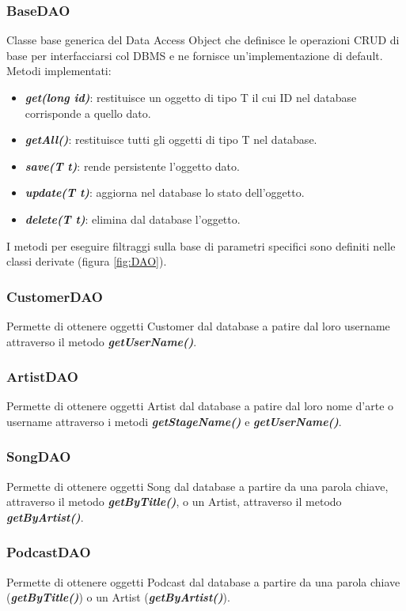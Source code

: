 \documentclass{article}
\begin{document}
  \subsubsection{BaseDAO}
  Classe base generica del Data Access Object che definisce le operazioni CRUD di base per interfacciarsi col DBMS e ne fornisce un'implementazione di default.
  Metodi implementati:
  \begin{itemize}
    \item \textbf{\textit{get(long id)}}: restituisce un oggetto di tipo T il cui ID nel database corrisponde a quello dato.
    \item \textbf{\textit{getAll()}}: restituisce tutti gli oggetti di tipo T nel database.
    \item \textbf{\textit{save(T t)}}: rende persistente l'oggetto dato.
    \item \textbf{\textit{update(T t)}}: aggiorna nel database lo stato dell'oggetto.
    \item \textbf{\textit{delete(T t)}}: elimina dal database l'oggetto.
  \end{itemize}
  I metodi per eseguire filtraggi sulla base di parametri specifici sono definiti nelle classi derivate (figura \ref{fig:DAO}).

  \subsubsection{CustomerDAO}
  Permette di ottenere oggetti Customer dal database a patire dal loro username attraverso il metodo \textbf{\textit{getUserName()}}.

  \subsubsection{ArtistDAO}
  Permette di ottenere oggetti Artist dal database a patire dal loro nome d'arte o username attraverso i metodi \textbf{\textit{getStageName()}} e \textbf{\textit{getUserName()}}.

  \subsubsection{SongDAO}
  Permette di ottenere oggetti Song dal database a partire da una parola chiave, attraverso il metodo \textbf{\textit{getByTitle()}}, o un Artist, attraverso il metodo \textbf{\textit{getByArtist()}}.

  \subsubsection{PodcastDAO}
  Permette di ottenere oggetti Podcast dal database a partire da una parola chiave (\textbf{\textit{getByTitle()}}) o un Artist (\textbf{\textit{getByArtist()}}).
\end{document}
